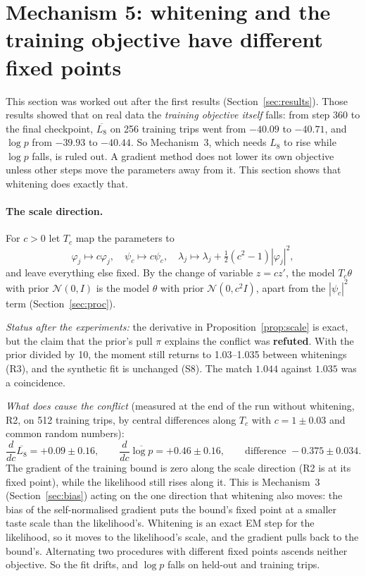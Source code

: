 \documentclass[11pt]{article}
\theoremstyle{remark}\newtheorem{remark}{Remark}
\newcommand{\N}{\mathcal{N}}
\begin{document}
\section{Mechanism 5: whitening and the training objective have different fixed points}\label{sec:fight}

This section was worked out after the first results (Section~\ref{sec:results}). Those results
showed that on real data the \emph{training objective itself} falls: from step 360 to the final
checkpoint, $\overline{L_8}$ on 256 training trips went from $-40.09$ to $-40.71$, and $\log p$ from
$-39.93$ to $-40.44$. So Mechanism~3, which needs $L_8$ to rise while $\log p$ falls, is ruled out.
A gradient method does not lower its own objective unless other steps move the parameters away
from it. This section shows that whitening does exactly that.

\paragraph{The scale direction.} For $c>0$ let $T_c$ map the parameters to
\[
\varphi_j\mapsto c\varphi_j,\quad \psi_c\mapsto c\psi_c,\quad
\lambda_j\mapsto\lambda_j+\tfrac12(c^2-1)|\varphi_j|^2,
\]
and leave everything else fixed. By the change of variable $z=cz'$, the model $T_c\theta$ with prior
$\N(0,I)$ is the model $\theta$ with prior $\N(0,c^2I)$, apart from the $|\psi_c|^2$ term
(Section~\ref{sec:proc}).

\emph{Status after the experiments:} the derivative in Proposition~\ref{prop:scale} is exact, but the
claim that the prior's pull $\pi$ explains the conflict was \textbf{refuted}. With the prior divided
by 10, the moment still returns to 1.03--1.035 between whitenings (R3), and the synthetic fit is
unchanged (S8). The match $1.044$ against $1.035$ was a coincidence.

\emph{What does cause the conflict} (measured at the end of the run without whitening, R2, on 512
training trips, by central differences along $T_c$ with $c=1\pm0.03$ and common random numbers):
\[
\frac{d}{dc}\overline{L_8}=+0.09\pm0.16,\qquad
\frac{d}{dc}\overline{\log p}=+0.46\pm0.16,\qquad
\text{difference } -0.375\pm0.034 .
\]
The gradient of the training bound is zero along the scale direction (R2 is at its fixed point),
while the likelihood still rises along it. This is Mechanism~3 (Section~\ref{sec:bias}) acting on the
one direction that whitening also moves: the bias of the self-normalised gradient puts the bound's
fixed point at a smaller taste scale than the likelihood's. Whitening is an exact EM step for the
likelihood, so it moves to the likelihood's scale, and the gradient pulls back to the bound's.
Alternating two procedures with different fixed points ascends neither objective. So the fit drifts,
and $\log p$ falls on held-out and training trips.
\end{document}
